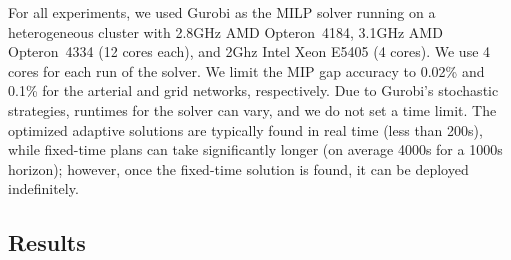 For all experiments, we used Gurobi as the MILP solver running on a
heterogeneous cluster with 2.8GHz AMD Opteron~4184, 3.1GHz AMD Opteron~4334 (12
cores each), and 2Ghz Intel Xeon E5405 (4 cores). We use 4 cores for each run of
the solver.
%
We limit the MIP gap accuracy to 0.02\% and 0.1\% for the arterial and grid
networks, respectively.
%
Due to Gurobi's stochastic strategies, runtimes for the solver can vary, and we
do not set a time limit.
%
The optimized adaptive solutions are typically found in real time (less than
200s), while fixed-time plans can take significantly longer (on average 4000s
for a 1000s horizon); however, once the fixed-time solution is found, it can be
deployed indefinitely.
%




\subsection{Results}


